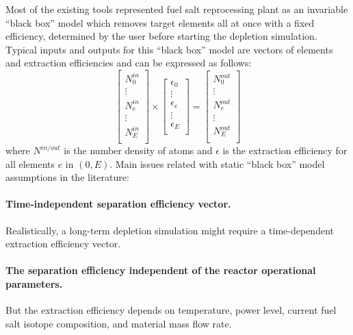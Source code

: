Most of the existing tools represented fuel salt reprocessing plant as an 
invariable ``black box'' model which removes target elements all at once with 
a fixed efficiency, determined by the user before starting the depletion 
simulation. Typical inputs and outputs for this ``black box'' model are 
vectors of elements and extraction efficiencies and can be expressed as 
follows:
\begin{equation}
\begin{bmatrix}
N^{in}_{0} \\ \vdots \\ N^{in}_{e} \\ \vdots \\ N^{in}_{E} \\
\end{bmatrix} 
\times
\begin{bmatrix}
\epsilon_{0} \\ \vdots \\ \epsilon_{e} \\ \vdots \\ \epsilon_{E} \\
\end{bmatrix} =
\begin{bmatrix}
N^{out}_{0}\\ \vdots \\ N^{out}_{e} \\ \vdots \\N^{out}_{E}  \\
\end{bmatrix}
\end{equation}
where $N^{in/out}$ is the number density of atoms and $\epsilon$ is the 
extraction efficiency for all elements $e$ in $(0, E)$. Main issues related 
with static ``black box'' model assumptions in the literature: 
\paragraph{Time-independent separation efficiency vector.} Realistically,   
	a long-term depletion simulation might require a time-dependent extraction 
	efficiency vector.
\paragraph{The separation efficiency independent of the reactor operational 
	parameters.} But the extraction efficiency depends on temperature, power 
	level, current fuel salt isotope composition, and material mass flow rate.
